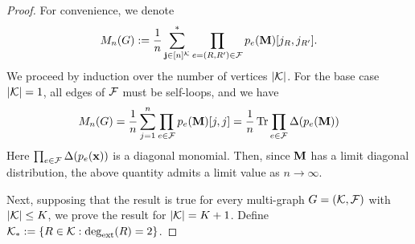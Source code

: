 \documentclass[10pt,reqno]{amsart}
\def\x{\mathbf{x}}
\def\Tr{\operatorname{Tr}}
\newcommand{\degext}{\deg_\mathrm{ext}}
\begin{document}
\begin{proof}
For convenience, we denote
\begin{align*}
	M_n(G) := \frac{1}{n}\sum_{\mathbf{j}\in[n]^{\mathcal{K}}}^* \prod_{e=(R,R')\in\mathcal{F}} 
	p_e(\mathbf{M})[j_R, j_{R'}].
\end{align*}
We proceed by induction over the number of vertices $|\mathcal{K}|$.
For the base case $|\mathcal{K}|=1$, all edges of $\mathcal{F}$ must be self-loops, and we have
\begin{align*}
	M_n(G) 
	= \frac{1}{n} \sum_{j=1}^n \prod_{e\in\cF} p_e(\bM)[j,j]
	= \frac{1}{n} \Tr \prod_{e\in\cF}\Delta(p_e(\bM))
\end{align*}
Here $\prod_{e\in\cF} \Delta(p_e(\x))$ is a diagonal monomial.
Then, since $\mathbf{M}$ has a limit diagonal distribution, the above quantity 
admits a limit value as $n\to\infty$.

Next, supposing that the result is true for every multi-graph $G=(\mathcal{K},\mathcal{F})$
with $|\mathcal{K}|\leq K$, we prove the result for $|\mathcal{K}| = K+1$.
Define $\cK_* := \{R\in\cK: \degext(R)=2\}$. 


\end{proof}
\end{document}
